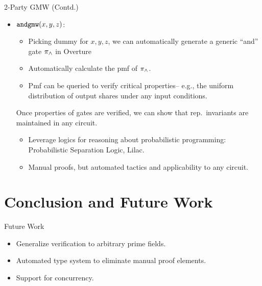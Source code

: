 \documentclass{beamer}
\begin{document}
\begin{frame}
  
  \begin{exampleblock}{2-Party GMW (Contd.)}
    \begin{itemize}
    \item $\texttt{andgmw}(x,y,z)$:
      \begin{itemize}
      \item Picking dummy for $x,y,z$, we can automatically generate a
        generic ``and'' gate $\pi_{\wedge}$ in Overture
      \item Automatically calculate the pmf of $\pi_{\wedge}$.
      \item Pmf can be queried to verify critical properties-- e.g., the
        uniform distribution of output shares under any input conditions. 
      \end{itemize}
      Once properties of gates are verified, we can show that rep.~invariants
      are maintained in any circuit.
      \begin{itemize}
      \item Leverage logics for reasoning about probabilistic programming: Probabilistic
        Separation Logic, Lilac.
      \item Manual proofs, but automated tactics and applicability to any circuit.
      \end{itemize}
    \end{itemize}
    
  \end{exampleblock}
    
\end{frame}

\section{Conclusion and Future Work}


\begin{frame}{Future Work}

  \begin{itemize}
  \item Generalize verification to arbitrary prime fields.
  \item Automated type system to eliminate manual proof elements.
  \item Support for concurrency.
  \end{itemize}

\end{frame}
\end{document}

